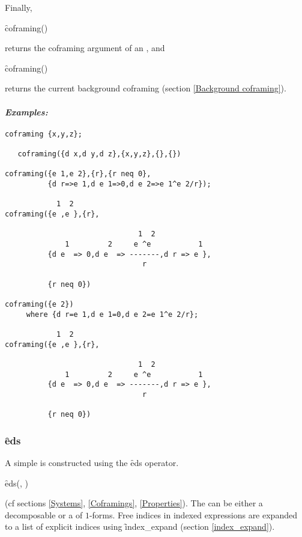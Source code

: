 Finally,
\begin{syntax}
	\f{coframing}()
\end{syntax}
returns the coframing argument of an , and
\begin{syntax}
	\f{coframing}()
\end{syntax}
returns the current background coframing (section \ref{Background
coframing}).

\paragraph{\textit{Examples:}}
\begin{verbatim}
coframing {x,y,z};

   coframing({d x,d y,d z},{x,y,z},{},{})

coframing({e 1,e 2},{r},{r neq 0},
          {d r=>e 1,d e 1=>0,d e 2=>e 1^e 2/r});

            1  2
coframing({e ,e },{r},

                               1  2
              1         2     e ^e           1
          {d e  => 0,d e  => -------,d r => e },
                                r

          {r neq 0})

coframing({e 2})
     where {d r=e 1,d e 1=0,d e 2=e 1^e 2/r};

            1  2
coframing({e ,e },{r},

                               1  2
              1         2     e ^e           1
          {d e  => 0,d e  => -------,d r => e },
                                r

          {r neq 0})
\end{verbatim}

\subsubsection{\f{eds}}
\label{eds}

\hypertarget{operator:EDS}{}
A simple  is constructed using the \f{eds} operator.
\begin{syntax}
	\f{eds}(,%
	)
\end{syntax}
(cf sections \ref{Systems}, \ref{Coframings}, \ref{Properties}). The
 can be either a decomposable  or a
 of $1$-forms. Free indices in indexed expressions are expanded
to a list of explicit indices using \f{index\_expand} (section
\ref{index_expand}).

